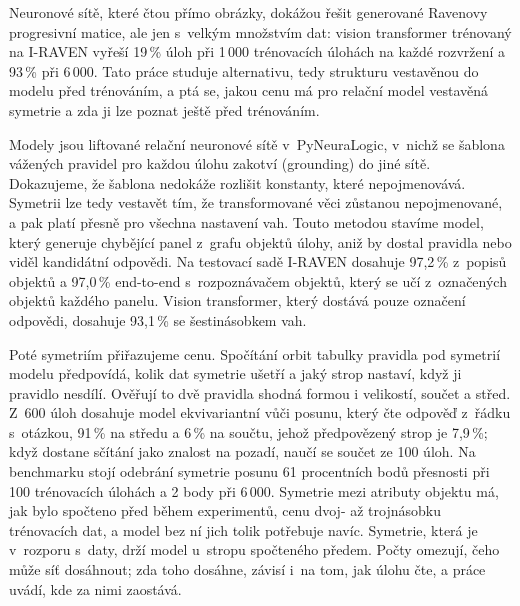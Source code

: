 Neuronové sítě, které čtou přímo obrázky, dokážou řešit generované Ravenovy progresivní matice, ale jen s~velkým
množstvím dat: vision transformer trénovaný na I-RAVEN vyřeší 19\,\% úloh při 1\,000 trénovacích úlohách na každé
rozvržení a 93\,\% při 6\,000. Tato práce studuje alternativu, tedy strukturu vestavěnou do modelu před trénováním, a
ptá se, jakou cenu má pro relační model vestavěná symetrie a zda ji lze poznat ještě před trénováním.

Modely jsou liftované relační neuronové sítě v~PyNeuraLogic, v~nichž se šablona vážených pravidel pro každou úlohu
zakotví (grounding) do jiné sítě. Dokazujeme, že šablona nedokáže rozlišit konstanty, které nepojmenovává. Symetrii
lze tedy vestavět tím, že transformované věci zůstanou nepojmenované, a pak platí přesně pro všechna nastavení vah.
Touto metodou stavíme model, který generuje chybějící panel z~grafu objektů úlohy, aniž by dostal pravidla nebo
viděl kandidátní odpovědi. Na testovací sadě I-RAVEN dosahuje 97,2\,\% z~popisů objektů a 97,0\,\% end-to-end
s~rozpoznávačem objektů, který se učí z~označených objektů každého panelu. Vision transformer, který dostává pouze
označení odpovědi, dosahuje 93,1\,\% se šestinásobkem vah.

Poté symetriím přiřazujeme cenu. Spočítání orbit tabulky pravidla pod symetrií modelu předpovídá, kolik dat
symetrie ušetří a jaký strop nastaví, když ji pravidlo nesdílí. Ověřují to dvě pravidla shodná formou i velikostí,
součet a střed. Z~600 úloh dosahuje model ekvivariantní vůči posunu, který čte odpověď z~řádku s~otázkou,
91\,\% na středu a 6\,\% na součtu, jehož předpovězený strop je 7,9\,\%; když dostane sčítání jako znalost na pozadí, naučí se součet ze 100 úloh. Na
benchmarku stojí odebrání symetrie posunu 61 procentních bodů přesnosti při 100 trénovacích úlohách a 2 body při
6\,000. Symetrie mezi atributy objektu má, jak bylo spočteno před během experimentů, cenu dvoj- až trojnásobku
trénovacích dat, a model bez ní jich tolik potřebuje navíc. Symetrie, která je v~rozporu s~daty, drží model u~stropu
spočteného předem. Počty omezují, čeho může síť dosáhnout; zda toho dosáhne, závisí i~na tom, jak úlohu čte, a práce
uvádí, kde za nimi zaostává.
